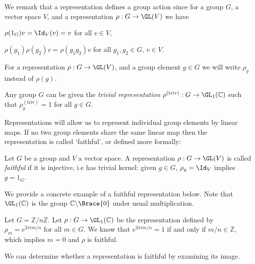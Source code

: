 \documentclass[../Project.tex]{subfiles}
\begin{document}
	We remark that a representation defines a group action since for a group $G$, a vector space $V$, and a representation $\rho : G \to \GL(V)$ we have
	\begin{menum}
		\item $\rho(1_G)v = \Id_V(v) = v$ for all $v \in V$,
		\item $\rho(g_1)\rho(g_2)v = \rho(g_1g_2)v$ for all $g_1,g_2 \in G,\,v \in V$.\\
	\end{menum}

For a representation $\rho : G \to \GL(V)$, and a group element $g \in G$ we will write $\rho_g$ instead of $\rho(g)$. 

\begin{defi}
	Any group $G$ can be given the \textit{trivial representation} $\rho^{(\text{triv})} : G \to \GL_1(\mathbb{C})$ such that $\rho^{(\text{triv})}_{g} = 1$ for all $g \in G$. \\
\end{defi}

Representations will allow us to represent individual group elements by linear maps. If no two group elements share the same linear map then the representation is called `faithful', or defined more formally:

\begin{defi}
	Let $G$ be a group and $V$ a vector space. A representation $\rho : G \to \GL(V)$ is called \textit{faithful} if it is injective, i.e has trivial kernel: given $g \in G$, $\rho_g = \Id_V$ implies  $g = 1_G$.
\end{defi}

We provide a concrete example of a faithful representation below. Note that $\GL_1(\mathbb{C})$ is the group $\mathbb{C}\backslash\Brace{0}$ under usual multiplication.

\begin{exam}[{\cite[Example 3.1.6]{1}}]
	Let $G = \mathbb{Z}/n\mathbb{Z}$. Let $\rho : G \to \GL_1(\mathbb{C})$ be the representation defined by $\rho_{m} = e^{2\pi i m/n}$ for all $m \in G$. We know that $e^{2\pi i m/n} = 1$ if and only if $m/n \in \mathbb{Z}$, which implies $m = 0$ and $\rho$ is faithful.
\end{exam}

We can determine whether a representation is faithful by examining its image.
\end{document}
